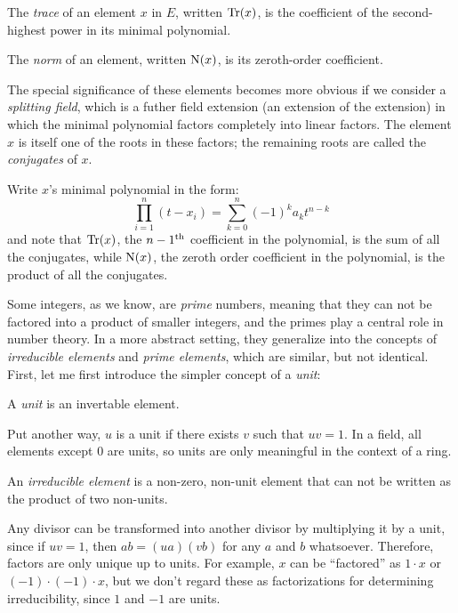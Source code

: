 The {\it trace} of an
element $x$ in $E$, written ${\rm Tr}(x)$, is the coefficient
of the second-highest power in its minimal polynomial.
\enddefinition

The {\it norm} of an element, written ${\rm N}(x)$, is its zeroth-order coefficient.
\enddefinition

The special significance of these elements becomes more obvious if we
consider a {\it splitting field}, which is a futher field extension
(an extension of the extension) in which the minimal polynomial
factors completely into linear factors.  The element $x$ is
itself one of the roots in these factors; the remaining
roots are called the {\it conjugates} of $x$.

Write $x$'s minimal polynomial in the form:
$$\prod_{i=1}^n \left( t - x_i \right) = \sum_{k=0}^n (-1)^{k} a_k t^{n-k}$$
and note that ${\rm Tr}(x)$, the $n-1^{\rm th}$ coefficient in the polynomial,
is the sum of all the conjugates, while ${\rm N}(x)$, the zeroth order
coefficient in the polynomial, is the product of all the conjugates.

\vfill\eject


Some integers, as we know, are {\it prime} numbers, meaning that they
can not be factored into a product of smaller integers, and the primes
play a central role in number theory.  In a more abstract setting,
they generalize into the concepts of {\it irreducible elements} and
{\it prime elements}, which are similar, but not identical.
First, let me
first introduce the simpler concept of a {\it unit}:

\begin{key point}
A {\it unit} is an invertable element.
\end{key point}

Put another way, $u$ is a unit if there exists $v$ such that $uv=1$.
In a field, all elements except 0 are units, so units are only
meaningful in the context of a ring.

\begin{key point}
An {\it irreducible element} is a non-zero, non-unit element
that can not be written as the product of two non-units.
\end{key point}

Any divisor can be transformed into another divisor by multiplying it
by a unit, since if $uv=1$, then $ab=(ua)(vb)$ for any $a$ and $b$
whatsoever.  Therefore, factors are only unique up to units.  For
example, $x$ can be ``factored'' as $1 \cdot x$ or $(-1)\cdot(-1)\cdot x$,
but we don't regard these as factorizations for
determining irreducibility, since $1$ and $-1$ are units.

